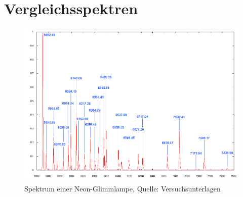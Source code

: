 \usepackage{pdfpages}



	\maketitle
	\tableofcontents
	\newpage
	\thispagestyle{empty}
	\null
	\newpage
	
	\newpage
	
	\newpage
	
	\newpage
	
	\newpage
	
	\newpage
	
	\newpage

	\appendix

	\section{Vergleichsspektren} %
	\label{sec:vergleichsspektren}
	
		\begin{figure}[H]
			\center
			\includegraphics[scale=0.45, angle=-90]{referenzen/ne-light-spec.png}
			\caption{Spektrum einer Neon-Glimmlampe,  Quelle: Versuchsunterlagen}
			\label{fig:ne-light-spec}
		\end{figure}

